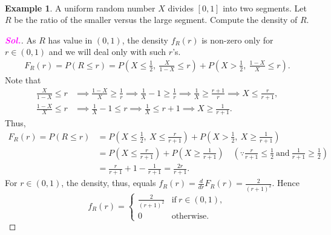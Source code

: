 \documentclass[12pt,a4paper]{article}
\theoremstyle{definition}
\newtheorem{example}{Example}[section]
\theoremstyle{definition}
\theoremstyle{definition}
\theoremstyle{definition}
\theoremstyle{remark}
\theoremstyle{definition}
\newcommand{\dispsty}{\displaystyle}
\newcommand{\sol}{\textcolor{magenta}{\bf \textit{Sol.}}\quad}
\begin{document}
\
\begin{example}
	A uniform random number $X$ divides $[0,1]$ into two segments. Let $R$ be the ratio of the smaller versus the large segment. Compute the density of $R$.	\begin{proof}[\sol]
	As $R$ has value in $(0,1)$, the density $f_R(r)$ is non-zero only for $r\in(0,1)$ and we will deal only with such $r$'s.\begin{align*}
	F_R(r)=P(R\leq r)=P\left(X\leq\frac{1}{2},\ \frac{X}{1-X}\leq r\right)+P\left(X>\frac{1}{2},\ \frac{1-X}{X}\leq r\right).
	\end{align*} Note that \begin{align*}
	\frac{X}{1-X}\leq r&\implies\frac{1-X}{X}\geq\frac{1}{r}\implies\frac{1}{X}-1\geq \frac{1}{r}\implies\frac{1}{X}\geq\frac{r+1}{r}\implies X\leq\frac{r}{r+1},\\
	\frac{1-X}{X}\leq r&\implies\frac{1}{X}-1\leq r\implies\frac{1}{X}\leq r+1\implies X\geq\frac{1}{r+1}.
	\end{align*} Thus, \begin{align*}
	F_R(r)=P(R\leq r)&=P\left(X\leq\frac{1}{2},\ X\leq \frac{r}{r+1}\right)+P\left(X>\frac{1}{2},\ X\geq\frac{1}{r+1}\right)\\
	&=P\left(X\leq\frac{r}{r+1}\right)+P\left(X\geq\frac{1}{r+1}\right)\quad\left(\because \frac{r}{r+1}\leq\frac{1}{2}\ \text{and}\ \frac{1}{r+1}\geq\frac{1}{2}\right)\\
	&=\frac{r}{r+1}+1-\frac{1}{r+1}=\frac{2r}{r+1}.
	\end{align*}
	For $r\in(0,1)$, the density, thus, equals $\dispsty
	f_R(r)=\frac{d}{dr}F_R(r)=\frac{2}{(r+1)^2}.
	$ Hence \[
	f_R(r)=\begin{cases}
	\dispsty\frac{2}{(r+1)^2} &\text{if}\ r\in(0,1),\\
	0 &\text{otherwise}.
	\end{cases}
	\]
	\end{proof}
\end{example}
\
\end{document}
